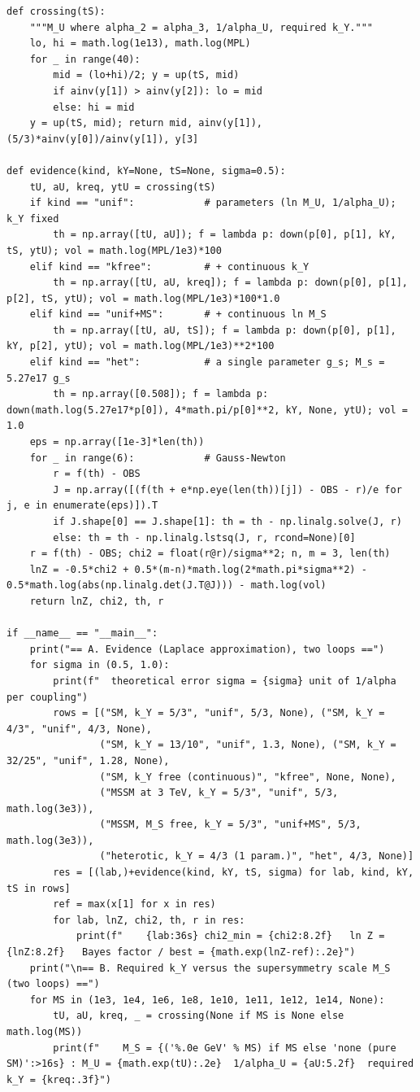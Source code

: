 \documentclass[11pt,a4paper]{article}
\begin{document}
\begin{lstlisting}
def crossing(tS):
    """M_U where alpha_2 = alpha_3, 1/alpha_U, required k_Y."""
    lo, hi = math.log(1e13), math.log(MPL)
    for _ in range(40):
        mid = (lo+hi)/2; y = up(tS, mid)
        if ainv(y[1]) > ainv(y[2]): lo = mid
        else: hi = mid
    y = up(tS, mid); return mid, ainv(y[1]), (5/3)*ainv(y[0])/ainv(y[1]), y[3]

def evidence(kind, kY=None, tS=None, sigma=0.5):
    tU, aU, kreq, ytU = crossing(tS)
    if kind == "unif":            # parameters (ln M_U, 1/alpha_U); k_Y fixed
        th = np.array([tU, aU]); f = lambda p: down(p[0], p[1], kY, tS, ytU); vol = math.log(MPL/1e3)*100
    elif kind == "kfree":         # + continuous k_Y
        th = np.array([tU, aU, kreq]); f = lambda p: down(p[0], p[1], p[2], tS, ytU); vol = math.log(MPL/1e3)*100*1.0
    elif kind == "unif+MS":       # + continuous ln M_S
        th = np.array([tU, aU, tS]); f = lambda p: down(p[0], p[1], kY, p[2], ytU); vol = math.log(MPL/1e3)**2*100
    elif kind == "het":           # a single parameter g_s; M_s = 5.27e17 g_s
        th = np.array([0.508]); f = lambda p: down(math.log(5.27e17*p[0]), 4*math.pi/p[0]**2, kY, None, ytU); vol = 1.0
    eps = np.array([1e-3]*len(th))
    for _ in range(6):            # Gauss-Newton
        r = f(th) - OBS
        J = np.array([(f(th + e*np.eye(len(th))[j]) - OBS - r)/e for j, e in enumerate(eps)]).T
        if J.shape[0] == J.shape[1]: th = th - np.linalg.solve(J, r)
        else: th = th - np.linalg.lstsq(J, r, rcond=None)[0]
    r = f(th) - OBS; chi2 = float(r@r)/sigma**2; n, m = 3, len(th)
    lnZ = -0.5*chi2 + 0.5*(m-n)*math.log(2*math.pi*sigma**2) - 0.5*math.log(abs(np.linalg.det(J.T@J))) - math.log(vol)
    return lnZ, chi2, th, r

if __name__ == "__main__":
    print("== A. Evidence (Laplace approximation), two loops ==")
    for sigma in (0.5, 1.0):
        print(f"  theoretical error sigma = {sigma} unit of 1/alpha per coupling")
        rows = [("SM, k_Y = 5/3", "unif", 5/3, None), ("SM, k_Y = 4/3", "unif", 4/3, None),
                ("SM, k_Y = 13/10", "unif", 1.3, None), ("SM, k_Y = 32/25", "unif", 1.28, None),
                ("SM, k_Y free (continuous)", "kfree", None, None),
                ("MSSM at 3 TeV, k_Y = 5/3", "unif", 5/3, math.log(3e3)),
                ("MSSM, M_S free, k_Y = 5/3", "unif+MS", 5/3, math.log(3e3)),
                ("heterotic, k_Y = 4/3 (1 param.)", "het", 4/3, None)]
        res = [(lab,)+evidence(kind, kY, tS, sigma) for lab, kind, kY, tS in rows]
        ref = max(x[1] for x in res)
        for lab, lnZ, chi2, th, r in res:
            print(f"    {lab:36s} chi2_min = {chi2:8.2f}   ln Z = {lnZ:8.2f}   Bayes factor / best = {math.exp(lnZ-ref):.2e}")
    print("\n== B. Required k_Y versus the supersymmetry scale M_S (two loops) ==")
    for MS in (1e3, 1e4, 1e6, 1e8, 1e10, 1e11, 1e12, 1e14, None):
        tU, aU, kreq, _ = crossing(None if MS is None else math.log(MS))
        print(f"    M_S = {('%.0e GeV' % MS) if MS else 'none (pure SM)':>16s} : M_U = {math.exp(tU):.2e}  1/alpha_U = {aU:5.2f}  required k_Y = {kreq:.3f}")


\end{lstlisting}
\end{document}
